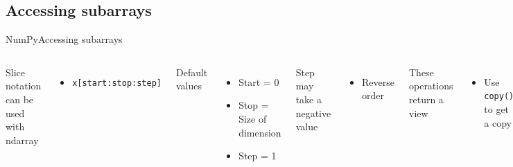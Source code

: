 \documentclass[10pt,compress]{beamer} %
\begin{document}
\subsection{Accessing subarrays}
\begin{frame}[fragile]{NumPy}{Accessing subarrays}
	\begin{columns}
		Slice notation can be used with ndarray
		\begin{itemize}
			\item \texttt{x[start:stop:step]}
		\end{itemize}
		Default values
		\begin{itemize}
			\item Start = 0
			\item Stop = Size of dimension
			\item Step = 1
		\end{itemize}
		Step may take a negative value
		\begin{itemize}
			\item Reverse order
		\end{itemize}
		These operations return a view 
		\begin{itemize}
			\item Use \texttt{copy()} to get a copy
		\end{itemize}

		\begin{exampleblock}{\footnotesize{Unidimensional array}}
		\vspace{-0.2cm} 
			\begin{lstlisting}
x[:5]   # first five elements
x[5:]   # elements after index 5
x[4:7]  # middle sub-array
x[::2]  # every other element
x[1::2] # every other element, starting at index 1
x[::-1] # all elements, reversed
			\end{lstlisting}
		\vspace{-0.2cm} 
		\end{exampleblock}

		\begin{exampleblock}{\footnotesize{Multidimensional a  rray}}
		\vspace{-0.2cm} 
			\begin{lstlisting}
x[:2, :3]  # 2 rows, 3 columns
x[:3, ::2] # all rows, every other column
x[::-1, ::-1]
			\end{lstlisting}
		\vspace{-0.2cm} 
		\end{exampleblock}
	\end{columns}
\end{frame}
\end{document}
